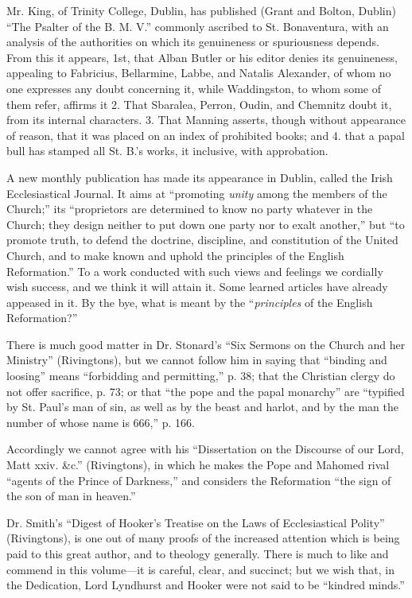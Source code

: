 Mr. King, of Trinity College, Dublin, has published
(Grant and Bolton, Dublin) ``The Psalter of the B. M. V.'' commonly
ascribed to St. Bonaventura, with an analysis of the authorities on
which its genuineness or spuriousness depends. From this it appears,
1st, that Alban Butler or his editor denies its genuineness, appealing
to Fabricius, Bellarmine, Labbe, and Natalis Alexander, of whom no one
expresses any doubt concerning it, while Waddingston, to whom some of
them refer, affirms it 2. That Sbaralea, Perron, Oudin, and Chemnitz
doubt it, from its internal characters. 3. That Manning asserts, though
without appearance of reason, that it was placed on an index of
prohibited books; and 4. that a papal bull has stamped all St. B.'s
works, it inclusive, with approbation.

A new monthly publication has made its appearance
in Dublin, called the Irish Ecclesiastical Journal. It aims at ``promoting
\emph{unity} among the members of the Church;'' its ``proprietors are
determined to know no party whatever in the Church; they design neither
to put down one party nor to exalt another,'' but ``to promote truth, to
defend the doctrine, discipline, and constitution of the United Church,
and to make known and uphold the principles of the English Reformation.''
To a work conducted with such views and feelings we cordially wish
success, and we think it will attain it. Some learned articles have
already appeased in it. By the bye, what is meant by the ``\emph{principles}
of the English Reformation?''

There is much good matter in Dr. Stonard's ``Six
Sermons on the Church and her Ministry'' (Rivingtons), but we cannot
follow him in saying that ``binding and loosing'' means ``forbidding and
permitting,'' p. 38; that the Christian clergy do not offer sacrifice, p.
73; or that ``the pope and the papal monarchy'' are ``typified by St. Paul's
man of sin, as well as by the beast and harlot, and by the man the
number of whose name is 666,'' p. 166.

Accordingly we cannot agree with his ``Dissertation
on the Discourse of our Lord, Matt xxiv. \&c.'' (Rivingtons), in which
he makes the Pope and Mahomed rival ``agents of the Prince of Darkness,''
and considers the Reformation ``the sign of the son of man in heaven.''

Dr. Smith's ``Digest of Hooker's Treatise on the
Laws of Ecclesiastical Polity'' (Rivingtons), is one out of many proofs
of the increased attention which is being paid to this great author, and
to theology generally. There is much to like and commend in this
volume—it is careful, clear, and succinct; but we wish that, in the
Dedication, Lord Lyndhurst and Hooker were not said to be ``kindred
minds.''

